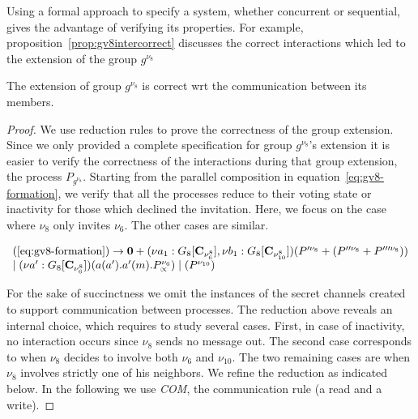Using a formal approach to specify a system, whether concurrent or sequential, gives the advantage of verifying its
properties. For example, proposition~\ref{prop:gv8intercorrect} discusses the correct interactions which led to the
extension of the group $g^{\nu_8}$

\begin{proposition}
	\label{prop:gv8intercorrect}
	The extension of group $g^{\nu_8}$ is correct wrt the communication between its members. 
\end{proposition}

\begin{proof} We use reduction rules to prove the correctness of the group extension. Since we only provided a
complete specification for group $g^{\nu_8}$'s extension it is easier to verify the correctness of the interactions
during that group extension, the process $P_{g^{\nu_8}}$. Starting from the parallel composition in
equation~\ref{eq:gv8-formation}, we verify that all the processes reduce to their voting state or inactivity for those
which declined the invitation. Here, we focus on the case where $\nu_8$ only invites $\nu_6$. The other cases are similar.

\[
\begin{array}{l}
	(\ref{eq:gv8-formation})\rightarrow \mathbf{0} + (\nu a_1:G_8[\mathbf{C}_{\nu_6^8}], \nu b_1:G_8[\mathbf{C}_{\nu_{10}^8}])(P^{\prime\nu_8} + (P^{\prime\prime\nu_8} + P^{\prime\prime\prime\nu_8}))\\
	\mid (\nu a^\prime:G_8[\mathbf{C}_{\nu_6^8}]) (a(a^\prime).a^\prime(m).P^{\nu_6}_\propto)\mid (P^{\nu_{10}})
\end{array}
\]

For the sake of succinctness we omit the instances of the secret channels created to support communication between
processes. The reduction above reveals an internal choice, which requires to study several cases. First, in case of
inactivity, no interaction occurs since $\nu_8$ sends no message out. The second case corresponds to when $\nu_8$ decides
to involve both $\nu_6$ and $\nu_{10}$. The two remaining cases are when $\nu_8$ involves strictly one of his neighbors.
We refine the reduction as indicated below. In the following we use \emph{COM}, the communication rule (a read and a
write).


\end{proof}
